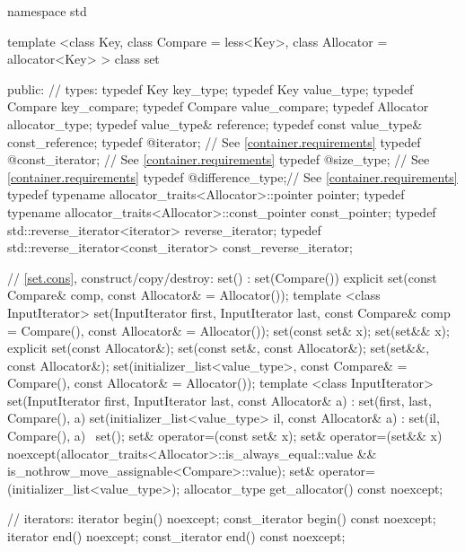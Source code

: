 \begin{codeblock}
namespace std {
  template <class Key, class Compare = less<Key>,
            class Allocator = allocator<Key> >
  class set {
  public:
    // types:
    typedef Key                                   key_type;
    typedef Key                                   value_type;
    typedef Compare                               key_compare;
    typedef Compare                               value_compare;
    typedef Allocator                             allocator_type;
    typedef value_type&                           reference;
    typedef const value_type&                     const_reference;
    typedef @\impdef@                iterator;       // See \ref{container.requirements}
    typedef @\impdef@                const_iterator; // See \ref{container.requirements}
    typedef @\impdef@                size_type;      // See \ref{container.requirements}
    typedef @\impdef@                difference_type;// See \ref{container.requirements}
    typedef typename allocator_traits<Allocator>::pointer           pointer;
    typedef typename allocator_traits<Allocator>::const_pointer     const_pointer;
    typedef std::reverse_iterator<iterator>       reverse_iterator;
    typedef std::reverse_iterator<const_iterator> const_reverse_iterator;

    // \ref{set.cons}, construct/copy/destroy:
    set() : set(Compare()) { }
    explicit set(const Compare& comp, const Allocator& = Allocator());
    template <class InputIterator>
      set(InputIterator first, InputIterator last,
          const Compare& comp = Compare(), const Allocator& = Allocator());
    set(const set& x);
    set(set&& x);
    explicit set(const Allocator&);
    set(const set&, const Allocator&);
    set(set&&, const Allocator&);
    set(initializer_list<value_type>, const Compare& = Compare(),
        const Allocator& = Allocator());
    template <class InputIterator>
      set(InputIterator first, InputIterator last, const Allocator& a)
        : set(first, last, Compare(), a) { }
    set(initializer_list<value_type> il, const Allocator& a)
      : set(il, Compare(), a) { }
   ~set();
    set& operator=(const set& x);
    set& operator=(set&& x)
      noexcept(allocator_traits<Allocator>::is_always_equal::value &&
               is_nothrow_move_assignable<Compare>::value);
    set& operator=(initializer_list<value_type>);
    allocator_type get_allocator() const noexcept;

    // iterators:
    iterator               begin() noexcept;
    const_iterator         begin() const noexcept;
    iterator               end() noexcept;
    const_iterator         end() const noexcept;

}}
\end{codeblock}
